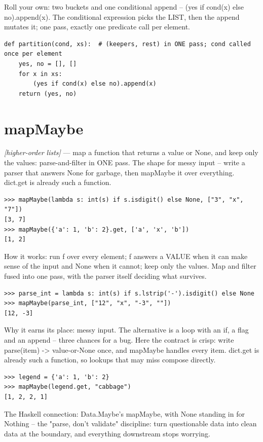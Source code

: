 \documentclass[11pt,letterpaper]{book}
\begin{document}
Roll your own: two buckets and one conditional append -- (yes if cond(x) else no).append(x). The conditional expression picks the LIST, then the append mutates it; one pass, exactly one predicate call per element.

\begin{lstlisting}[style=code]
def partition(cond, xs):  # (keepers, rest) in ONE pass; cond called once per element
    yes, no = [], []
    for x in xs:
        (yes if cond(x) else no).append(x)
    return (yes, no)
\end{lstlisting}

\section{mapMaybe}
\noindent\textit{[higher-order lists]} --- map a function that returns a value or None, and keep only the values: parse-and-filter in ONE pass. The shape for messy input -- write a parser that answers None for garbage, then mapMaybe it over everything. dict.get is already such a function.
\begin{lstlisting}[style=spec]
>>> mapMaybe(lambda s: int(s) if s.isdigit() else None, ["3", "x", "7"])
[3, 7]
>>> mapMaybe({'a': 1, 'b': 2}.get, ['a', 'x', 'b'])
[1, 2]
\end{lstlisting}

How it works: run f over every element; f answers a VALUE when it can make sense of the input and None when it cannot; keep only the values. Map and filter fused into one pass, with the parser itself deciding what survives.

\begin{lstlisting}[style=spec]
>>> parse_int = lambda s: int(s) if s.lstrip('-').isdigit() else None
>>> mapMaybe(parse_int, ["12", "x", "-3", ""])
[12, -3]
\end{lstlisting}

Why it earns its place: messy input. The alternative is a loop with an if, a flag and an append -- three chances for a bug. Here the contract is crisp: write parse(item) -> value-or-None once, and mapMaybe handles every item. dict.get is already such a function, so lookups that may miss compose directly.

\begin{lstlisting}[style=spec]
>>> legend = {'a': 1, 'b': 2}
>>> mapMaybe(legend.get, "cabbage")
[1, 2, 2, 1]
\end{lstlisting}

The Haskell connection: Data.Maybe's mapMaybe, with None standing in for Nothing -- the "parse, don't validate" discipline: turn questionable data into clean data at the boundary, and everything downstream stops worrying.
\end{document}
